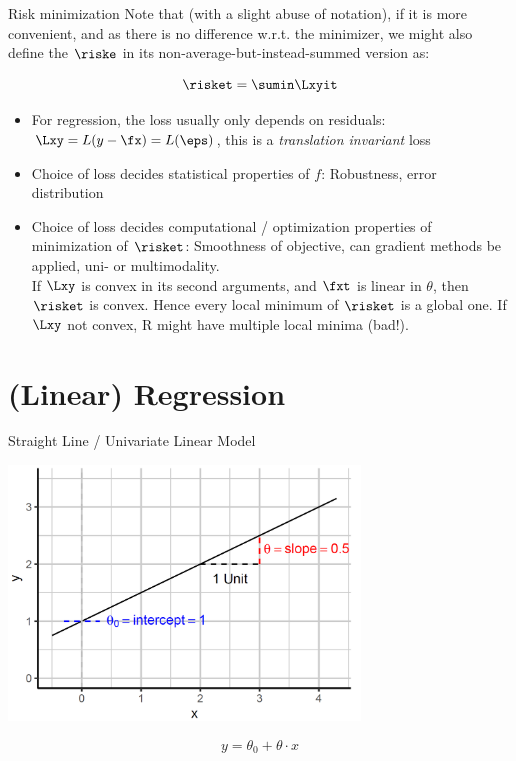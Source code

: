 \begin{vbframe}{Risk minimization}
Note that (with a slight abuse of notation), if it is more convenient, and as there is no difference w.r.t.
the minimizer, we might also define the $\riske$ in its non-average-but-instead-summed version as:

$$
\risket = \sumin \Lxyit
$$

\framebreak

\begin{itemize}
\item For regression, the loss usually only depends on residuals: $\Lxy = L(y - \fx) = L(\eps)$,
  this is a \emph{translation invariant} loss
\item Choice of loss decides statistical properties of $f$: Robustness, error distribution
\item Choice of loss decides computational / optimization properties of minimization of $\risket$:
  Smoothness of objective, can gradient methods be applied, uni- or multimodality. \\
  If $\Lxy$ is convex in its second arguments, and $\fxt$ is linear in $\theta$, then $\risket$ is convex.
  Hence every local minimum of $\risket$ is a global one. If $\Lxy$ not convex,
  R might have multiple local minima (bad!).
\end{itemize}
\end{vbframe}

\section{(Linear) Regression}

\begin{frame}{Straight Line / Univariate Linear Model}

\scriptsize

\begin{center}
\includegraphics[width=0.7\textwidth]{plots/straight-line.png}
\end{center}


\normalsize 

\[
y = \theta_0 + \theta \cdot x
\]

\end{frame}

